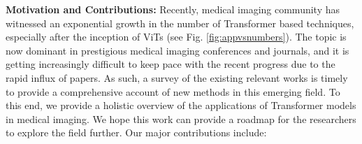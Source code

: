 \documentclass[10pt,journal,compsoc]{IEEEtran}
\begin{document}
\textbf{Motivation and Contributions:} Recently, medical imaging community has witnessed an exponential growth in the number of Transformer based techniques, especially after the inception of ViTs (see Fig. \ref{fig:appvsnumbers}).
The topic is now dominant in prestigious medical imaging conferences and journals, and it is getting increasingly difficult to keep pace with the recent progress due to the rapid influx of papers. 
As such, a survey of the existing relevant works is timely 
to provide a comprehensive account of new methods %
in this emerging field. To this end, we provide a holistic overview of the applications of Transformer models in medical imaging. We hope this work can provide a roadmap for the researchers to explore the field further. Our major contributions include:
\end{document}
